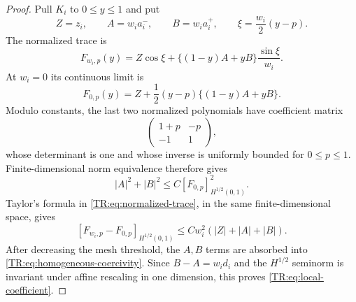 \documentclass[11pt]{amsart}
\numberwithin{equation}{section}
\theoremstyle{definition}
\theoremstyle{remark}
\begin{document}
\begin{proof}
Pull $K_i$ to $0\le y\le1$ and put
\begin{equation*}
 Z=z_i,\qquad A=w_i a_i^-,\qquad B=w_i a_i^+,
 \qquad \xi=\frac{w_i}{2}(y-p).
\end{equation*}
The normalized trace is
\begin{equation}\label{TR:eq:normalized-trace}
 F_{w_i,p}(y)=Z\cos\xi+\{(1-y)A+yB\}\frac{\sin\xi}{w_i}.
\end{equation}
At $w_i=0$ its continuous limit is
\begin{equation}\label{TR:eq:homogeneous-normalized-trace}
 F_{0,p}(y)=Z+\frac12(y-p)\{(1-y)A+yB\}.
\end{equation}
Modulo constants, the last two normalized polynomials have coefficient
matrix
\begin{equation*}
 \begin{pmatrix}1+p&-p\\-1&1\end{pmatrix},
\end{equation*}
whose determinant is one and whose inverse is uniformly bounded for
$0\le p\le1$.  Finite-dimensional norm equivalence therefore gives
\begin{equation}\label{TR:eq:homogeneous-coercivity}
 |A|^2+|B|^2\le C[F_{0,p}]_{H^{1/2}(0,1)}^2.
\end{equation}
Taylor's formula in \eqref{TR:eq:normalized-trace}, in the same
finite-dimensional space, gives
\begin{equation}\label{TR:eq:normalized-perturbation}
 [F_{w_i,p}-F_{0,p}]_{H^{1/2}(0,1)}
 \le Cw_i^2(|Z|+|A|+|B|).
\end{equation}
After decreasing the mesh threshold, the $A,B$ terms are absorbed into
\eqref{TR:eq:homogeneous-coercivity}.  Since
$B-A=w_i d_i$ and the $H^{1/2}$ seminorm is invariant under affine
rescaling in one dimension, this proves \eqref{TR:eq:local-coefficient}.


\end{proof}
\end{document}
